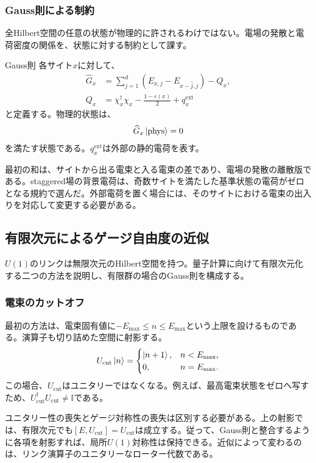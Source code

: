\documentclass[a4paper,10.5pt]{article}
\numberwithin{equation}{section}
\providecommand{\id}{\mathbb{I}}
\begin{document}
\subsubsection{Gauss則による制約}
全Hilbert空間の任意の状態が物理的に許されるわけではない。電場の発散と電荷密度の関係を、状態に対する制約として課す。
\begin{defbox}{Gauss則}
各サイト$x$に対して、
\begin{align}
\widehat G_x&=\sum_{j=1}^d(E_{x,j}-E_{x-\hat j,j})-Q_x,\\
Q_x&=\chi_x^\dagger\chi_x-\frac{1-\epsilon(x)}2+q_x^{\mathrm{ext}}
\end{align}
と定義する。物理的状態は、
\begin{align}
\widehat G_x\ket{\mathrm{phys}}=0
\end{align}
を満たす状態である。$q_x^{\mathrm{ext}}$は外部の静的電荷を表す。
\end{defbox}
最初の和は、サイトから出る電束と入る電束の差であり、電場の発散の離散版である。staggered場の背景電荷は、奇数サイトを満たした基準状態の電荷がゼロとなる規約で選んだ。外部電荷を置く場合には、そのサイトにおける電束の出入りを対応して変更する必要がある。

\subsection{有限次元によるゲージ自由度の近似}
$U(1)$のリンクは無限次元のHilbert空間を持つ。量子計算に向けて有限次元化する二つの方法を説明し、有限群の場合のGauss則を構成する。

\subsubsection{電束のカットオフ}
最初の方法は、電束固有値に$-E_{\max}\leq n\leq E_{\max}$という上限を設けるものである。演算子も切り詰めた空間に射影する。
\begin{align}
U_{\mathrm{cut}}\ket n=
\begin{cases}
\ket{n+1},&n<E_{\max},\\
0,&n=E_{\max}.
\end{cases}
\end{align}
この場合、$U_{\mathrm{cut}}$はユニタリーではなくなる。例えば、最高電束状態をゼロへ写すため、$U_{\mathrm{cut}}^\dagger U_{\mathrm{cut}}\neq\id$である。
\begin{remarkbox}
ユニタリー性の喪失とゲージ対称性の喪失は区別する必要がある。上の射影では、有限次元でも$[E,U_{\mathrm{cut}}]=U_{\mathrm{cut}}$は成立する。従って、Gauss則と整合するように各項を射影すれば、局所$U(1)$対称性は保持できる。近似によって変わるのは、リンク演算子のユニタリーなローター代数である。
\end{remarkbox}
\end{document}
